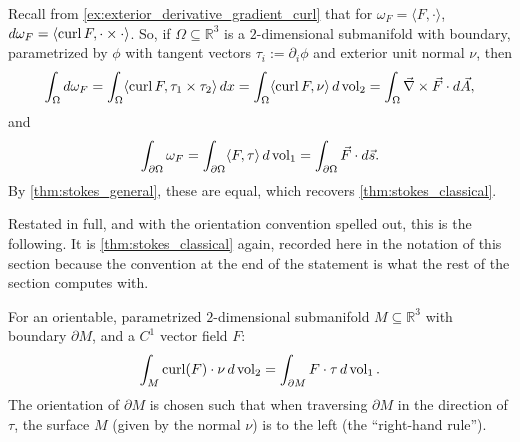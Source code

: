 Recall from \cref{ex:exterior_derivative_gradient_curl} that for $\omega_F =
\langle F,\cdot\rangle$, $d\omega_F = \langle\operatorname{curl} F,\cdot\times\cdot\rangle$. So, if $\Omega
\subseteq \mathbb{R}^3$ is a $2$-dimensional submanifold with boundary, parametrized by $\phi$
with tangent vectors $\tau_i := \partial_i\phi$ and exterior unit normal $\nu$, then
\[
\int_\Omega d\omega_F = \int_\Omega \langle\operatorname{curl} F,\tau_1\times\tau_2\rangle\,dx
  = \int_\Omega \langle\operatorname{curl} F,\nu\rangle\,d\operatorname{vol}_2 = \int_\Omega \vec\nabla\times\vec F\cdot
  d\vec A,
\]
and
\[\int_{\partial\Omega} \omega_F = \int_{\partial\Omega} \langle F,\tau\rangle\,d\operatorname{vol}_1
  = \int_{\partial\Omega} \vec F\cdot d\vec s.\]
By \cref{thm:stokes_general}, these are equal, which recovers \cref{thm:stokes_classical}.

Restated in full, and with the orientation convention spelled out, this is the following. It is
\cref{thm:stokes_classical} again, recorded here in the notation of this section because the
convention at the end of the statement is what the rest of the section computes with.

\begin{theorem}
\label{thm:stokes_3d}
For an orientable, parametrized $2$-dimensional submanifold $M \subseteq \mathbb{R}^3$ with boundary $\partial M$, and a $C^1$ vector field $F$:
\[\int_M \operatorname{curl}(F) \cdot \nu \,d\operatorname{vol}_2 = \int_{\partial M} F \cdot \tau \,d\operatorname{vol}_1.\]
The orientation of $\partial M$ is chosen such that when traversing $\partial M$ in the direction of $\tau$, the surface $M$ (given by the normal $\nu$) is to the left (the ``right-hand rule'').
\end{theorem}


